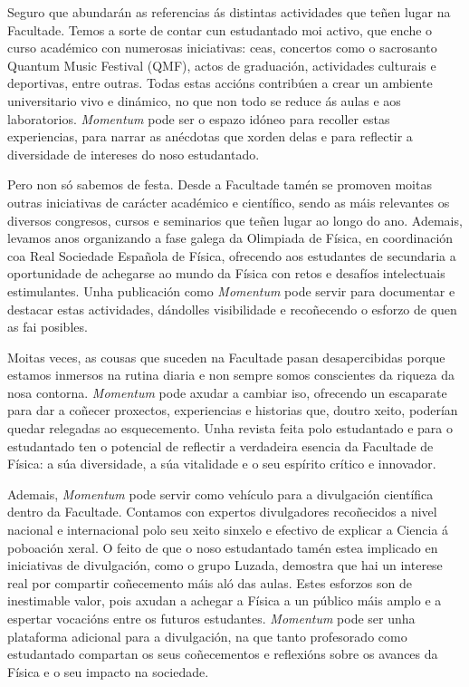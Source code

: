 \begin{multicols}{2}
Seguro que abundarán as referencias ás distintas actividades que teñen lugar na
Facultade. Temos a sorte de contar cun estudantado moi activo, que enche o
curso académico con numerosas iniciativas: ceas, concertos como o sacrosanto
Quantum Music Festival (QMF), actos de graduación, actividades culturais e
deportivas, entre outras. Todas estas accións contribúen a crear un ambiente
universitario vivo e dinámico, no que non todo se reduce ás aulas e aos
laboratorios. \textit{Momentum} pode ser o espazo idóneo para recoller estas
experiencias, para narrar as anécdotas que xorden delas e para reflectir a
diversidade de intereses do noso estudantado.

Pero non só sabemos de festa. Desde a Facultade tamén se promoven moitas outras
iniciativas de carácter académico e científico, sendo as máis relevantes os
diversos congresos, cursos e seminarios que teñen lugar ao longo do ano.
Ademais, levamos anos organizando a fase galega da Olimpiada de Física, en
coordinación coa Real Sociedade Española de Física, ofrecendo aos estudantes de
secundaria a oportunidade de achegarse ao mundo da Física con retos e desafíos
intelectuais estimulantes. Unha publicación como \textit{Momentum} pode servir
para documentar e destacar estas actividades, dándolles visibilidade e
recoñecendo o esforzo de quen as fai posibles.

Moitas veces, as cousas que suceden na Facultade pasan desapercibidas porque
estamos inmersos na rutina diaria e non sempre somos conscientes da riqueza da
nosa contorna. \textit{Momentum} pode axudar a cambiar iso, ofrecendo un
escaparate para dar a coñecer proxectos, experiencias e historias que, doutro
xeito, poderían quedar relegadas ao esquecemento. Unha revista feita polo
estudantado e para o estudantado ten o potencial de reflectir a verdadeira
esencia da Facultade de Física: a súa diversidade, a súa vitalidade e o seu
espírito crítico e innovador.

Ademais, \textit{Momentum} pode servir como vehículo para a divulgación
científica dentro da Facultade. Contamos con expertos divulgadores recoñecidos
a nivel nacional e internacional polo seu xeito sinxelo e efectivo de explicar
a Ciencia á poboación xeral. O feito de que o noso estudantado tamén estea
implicado en iniciativas de divulgación, como o grupo Luzada, demostra que hai
un interese real por compartir coñecemento máis aló das aulas. Estes esforzos
son de inestimable valor, pois axudan a achegar a Física a un público máis
amplo e a espertar vocacións entre os futuros estudantes. \textit{Momentum}
pode ser unha plataforma adicional para a divulgación, na que tanto profesorado
como estudantado compartan os seus coñecementos e reflexións sobre os avances
da Física e o seu impacto na sociedade.


\end{multicols}

